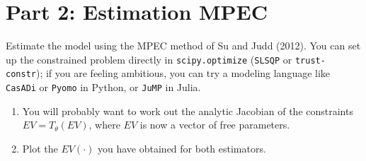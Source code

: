 \documentclass{article}
\begin{document}
\section*{Part 2: Estimation MPEC}
Estimate the model using the MPEC method of Su and Judd (2012). You can set up the constrained problem directly in \texttt{scipy.optimize} (\texttt{SLSQP} or \texttt{trust-constr}); if you are feeling ambitious, you can try a modeling language like \texttt{CasADi} or \texttt{Pyomo} in Python, or \texttt{JuMP} in Julia.
\begin{enumerate}
\item You will probably want to work out the analytic Jacobian of the constraints $EV = T_\theta(EV)$, where $EV$ is now a vector of free parameters.
\item Plot the $EV(\cdot)$ you have obtained for both estimators.
\end{enumerate}
\end{document}
